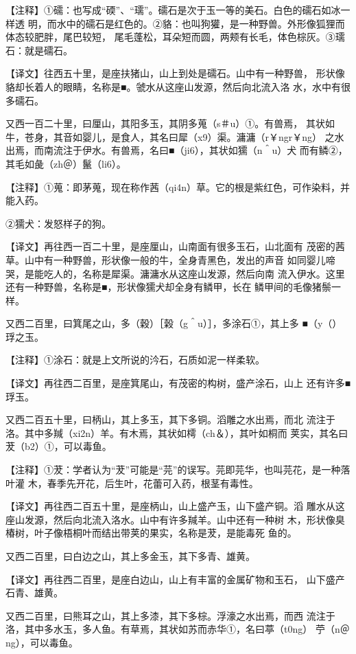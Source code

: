 \documentclass[a4paper,12pt,UTF8,twoside]{ctexbook}
\begin{document}
【注释】①礝：也写成“碝”、“瓀”。礝石是次于玉一等的美石。白色的礝石如冰一样透 明，而水中的礝石是红色的。②貉：也叫狗獾，是一种野兽。外形像狐狸而体态较肥胖，尾巴较短， 尾毛蓬松，耳朵短而圆，两颊有长毛，体色棕灰。③瓀石：就是礝石。

【译文】往西五十里，是座扶猪山，山上到处是礝石。山中有一种野兽， 形状像貉却长着人的眼睛，名称是■。虢水从这座山发源，然后向北流入洛 水，水中有很多礝石。

又西一百二十里，曰厘山，其阳多玉，其阴多蒐（s＃u）①。有兽焉， 其状如牛，苍身，其音如婴儿，是食人，其名曰犀（x9）渠。滽滽（r￥ngr￥ng） 之水出焉，而南流注于伊水。有兽焉，名曰■（ji6），其状如獳（n＾u）犬 而有鳞②，其毛如彘（zh＠）鬣（li6）。

【注释】①蒐：即茅蒐，现在称作茜（qi4n）草。它的根是紫红色，可作染料，并能入药。

②獳犬：发怒样子的狗。

【译文】再往西一百二十里，是座厘山，山南面有很多玉石，山北面有 茂密的茜草。山中有一种野兽，形状像一般的牛，全身青黑色，发出的声音 如同婴儿啼哭，是能吃人的，名称是犀渠。滽滽水从这座山发源，然后向南 流入伊水。这里还有一种野兽，名称是■，形状像獳犬却全身有鳞甲，长在 鳞甲间的毛像猪鬃一样。

又西二百里，曰箕尾之山，多（穀）［榖（g＾u）］，多涂石①，其上多 ■（y（）琈之玉。

【注释】①涂石：就是上文所说的汵石，石质如泥一样柔软。

【译文】再往西二百里，是座箕尾山，有茂密的构树，盛产涂石，山上 还有许多■琈玉。

又西二百五十里，曰柄山，其上多玉，其下多铜。滔雕之水出焉，而北 流注于洛。其中多羬（xi2n）羊。有木焉，其状如樗（ch＆），其叶如桐而 荚实，其名曰茇（b2）①，可以毒鱼。

【注释】①茇：学者认为“茇”可能是“芫”的误写。芫即芫华，也叫芫花，是一种落叶灌 木，春季先开花，后生叶，花蕾可入药，根茎有毒性。

【译文】再往西二百五十里，是座柄山，山上盛产玉，山下盛产铜。滔 雕水从这座山发源，然后向北流入洛水。山中有许多羬羊。山中还有一种树 木，形状像臭椿树，叶子像梧桐叶而结出带荚的果实，名称是茇，是能毒死 鱼的。

又西二百里，曰白边之山，其上多金玉，其下多青、雄黄。

【译文】再往西二百里，是座白边山，山上有丰富的金属矿物和玉石， 山下盛产石青、雄黄。

又西二百里，曰熊耳之山，其上多漆，其下多棕。浮濠之水出焉，而西 流注于洛，其中多水玉，多人鱼。有草焉，其状如苏而赤华①，名曰葶（t0ng） 苧（n＠ng），可以毒鱼。
\end{document}
